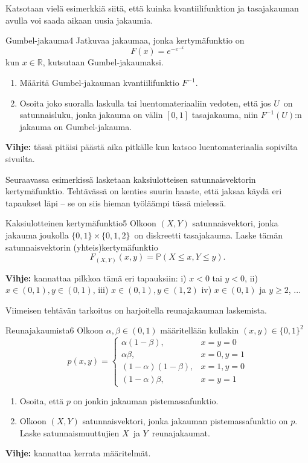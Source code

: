 \documentclass[11pt,a4paper]{amsart}
\newcommand{\R}{\mathbb{R}}
\newcommand{\1}{\mathbf{1}}
\renewcommand{\P}{\mathbb P}
\begin{document}
Katsotaan vielä esimerkkiä siitä, että kuinka kvantiilifunktion ja tasajakauman avulla voi saada aikaan uusia jakaumia.
\begin{Exercises}{Gumbel-jakauma}{4}
Jatkuvaa jakaumaa, jonka kertymäfunktio on 
\[
F(x)=e^{-e^{-x}}
\]
kun $x\in \R$, kutsutaan Gumbel-jakaumaksi.

\begin{enumerate}
\item Määritä Gumbel-jakauman kvantiilifunktio $F^{-1}$.

\item Osoita joko suoralla laskulla tai luentomateriaaliin vedoten, että jos $U$ on satunnaisluku, jonka jakauma on välin $[0,1]$ tasajakauma, niin $F^{-1}(U)$:n jakauma on Gumbel-jakauma.
\end{enumerate}
{\bf Vihje:}  tässä pitäisi päästä aika pitkälle kun katsoo luentomateriaalia sopivilta sivuilta.

\end{Exercises}

Seuraavassa esimerkissä lasketaan kaksiulotteisen satunnaisvektorin kertymäfunktio. Tehtävässä on kenties suurin haaste, että jaksaa käydä eri tapaukset läpi -- se on siis hieman työläämpi tässä mielessä.

\begin{Exercises}{Kaksiulotteinen kertymäfunktio}{5}
Olkoon $(X,Y)$ satunnaisvektori, jonka jakauma joukolla $\{0,1\}\times \{0,1,2\}$ on diskreetti tasajakauma. 
Laske tämän satunnaisvektorin (yhteis)kertymäfunktio
\[
F_{(X,Y)}(x,y)=\P(X \leq x,Y\leq y).
\]


\medskip

{\bf Vihje: }kannattaa pilkkoa tämä eri tapauksiin: i) $x<0$ tai $y<0$, ii) $x\in(0,1), y\in (0,1)$, iii) $x\in(0,1), y\in(1,2)$ iv) $x\in(0,1)$ ja $y\geq 2$, ...



\end{Exercises}


Viimeisen tehtävän tarkoitus on harjoitella reunajakauman laskemista.
\begin{Exercises}{Reunajakaumista}{6}
Olkoon $\alpha,\beta\in (0,1)$ määritellään kullakin $(x,y)\in \{0,1\}^2$
\[
p(x,y)=\begin{cases}
\alpha(1-\beta), & x=y=0\\
\alpha\beta, & x=0, y=1\\
(1-\alpha)(1-\beta), & x=1, y=0\\
(1-\alpha)\beta, & x=y=1
\end{cases}
\]
 \begin{enumerate}
 \item Osoita, että $p$ on jonkin jakauman pistemassafunktio.

 \item Olkoon $(X,Y)$ satunnaisvektori, jonka jakauman pistemassafunktio on $p$. Laske satunnaismuuttujien $X$ ja $Y$ reunajakaumat.

 \end{enumerate}
 {\bf Vihje: } kannattaa kerrata määritelmät.
\end{Exercises}
\end{document}
